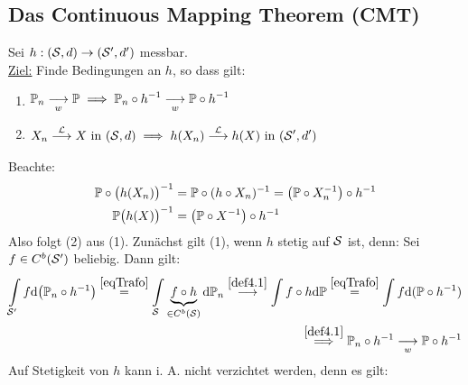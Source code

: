 \subsection{Das Continuous Mapping Theorem (CMT)}
Sei $h:(\S,d)\to(\S',d')$ messbar.\\
\underline{Ziel:} Finde Bedingungen an $h$, so dass gilt:
\begin{enumerate}[label=(\arabic*)]
	\item $\begin{aligned}
		\P_n\stackrelnew{w}{}{\longrightarrow}\P\implies \P_n\circ h^{-1}\stackrelnew{w}{}{\longrightarrow} \P\circ h^{-1}
	\end{aligned}$
	\item $\begin{aligned}
		X_n\stackrel{\L}{\longrightarrow} X\text{ in }(\S,d)\implies h(X_n)\stackrel{\L}{\longrightarrow} h(X)\text{ in }(\S',d')
	\end{aligned}$
\end{enumerate}
Beachte: 
\begin{align*}
	\P\circ\big(h(X_n)\big)^{-1}&=\P\circ(h\circ X_n)^{-1}=\big(\P\circ X_n^{-1}\big)\circ h^{-1}\\
	\P\big(h(X)\big)^{-1}&=\big(\P\circ X^{-1}\big)\circ h^{-1}
\end{align*}
Also folgt (2) aus (1). Zunächst gilt (1), wenn $h$ stetig auf $\S$  ist, denn: Sei $f\in C^b(\S')$ beliebig. Dann gilt:
\begin{align*}
	\int\limits_{\S'} f\d \big(\P_n\circ h^{-1}\big)
	\stackeq{\eqref{eqTrafo}}
	\int\limits_{\S} \underbrace{ f\circ h}_{\in C^b(\S)}\d \P_n
	\stackrel{\ref{def4.1}}{\longrightarrow}\int\limits f\circ h\d \P
	\stackeq{\eqref{eqTrafo}}
	\int\limits f\d(\P\circ h^{-1})\\
	\stackrel{\ref{def4.1}}{\implies}
	\P_n\circ h^{-1}\stackrelnew{w}{}{\longrightarrow} \P\circ h^{-1}
\end{align*}
Auf Stetigkeit von $h$ kann i. A. nicht verzichtet werden, denn es gilt:

